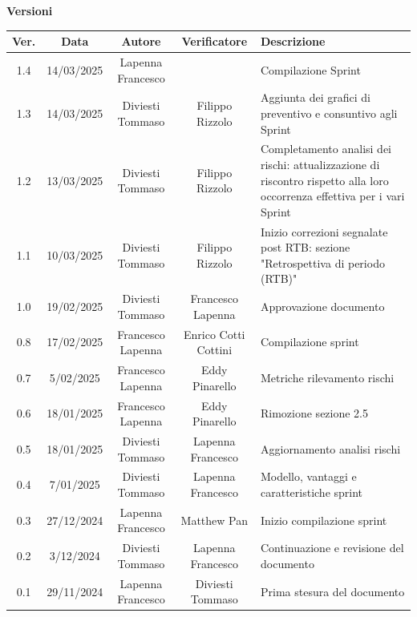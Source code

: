 \documentclass{article}
\begin{document}
\newpage
\begin{table}[h!]
\centering
\textbf{Versioni} \\ %
\vspace{2mm} %
\renewcommand{\arraystretch}{1.7}
    
\begin{tabular}{|c|c|c|c|m{}|}
    \hline
    \textbf{Ver.} & \textbf{Data} & \textbf{Autore} & \textbf{Verificatore} & \textbf{Descrizione} \\
    \hline
    1.4 & 14/03/2025 & Lapenna Francesco &  & Compilazione Sprint \\
    \hline
    1.3 & 14/03/2025 & Diviesti Tommaso & Filippo Rizzolo & Aggiunta dei grafici di preventivo e consuntivo agli Sprint \\
    \hline
    1.2 & 13/03/2025 & Diviesti Tommaso & Filippo Rizzolo & Completamento analisi dei rischi: attualizzazione di riscontro rispetto alla loro occorrenza effettiva per i vari Sprint \\
    \hline
    1.1 & 10/03/2025 & Diviesti Tommaso & Filippo Rizzolo & Inizio correzioni segnalate post RTB: sezione "Retrospettiva di periodo (RTB)" \\
    \hline
    1.0 & 19/02/2025 & Diviesti Tommaso & Francesco Lapenna & Approvazione documento \\
    \hline
    0.8 & 17/02/2025 & Francesco Lapenna & Enrico Cotti Cottini & Compilazione sprint \\
    \hline
    0.7 & 5/02/2025 & Francesco Lapenna & Eddy Pinarello & Metriche rilevamento rischi \\
    \hline
    0.6 & 18/01/2025 & Francesco Lapenna & Eddy Pinarello & Rimozione sezione 2.5 \\
    \hline
    0.5 & 18/01/2025 & Diviesti Tommaso & Lapenna Francesco & Aggiornamento analisi rischi \\
    \hline
    0.4 & 7/01/2025 & Diviesti Tommaso & Lapenna Francesco & Modello, vantaggi e caratteristiche sprint \\
    \hline
    0.3 & 27/12/2024 & Lapenna Francesco & Matthew Pan & Inizio compilazione sprint \\
    \hline
    0.2 & 3/12/2024 & Diviesti Tommaso & Lapenna Francesco & Continuazione e revisione del documento \\
    \hline
    0.1 & 29/11/2024 & Lapenna Francesco & Diviesti Tommaso & Prima stesura del documento \\
    \hline
\end{tabular}
\end{table}
\end{document}
